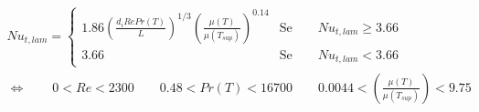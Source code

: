 \documentclass[a4paper,10pt]{article}                                                                                       %
\begin{document}
\begin{equation}                                                                                                            %
  \begin{aligned}                                                                                                           %
  Nu_{t,lam} = \begin{cases}1.86\left(\frac{d_iRePr(T)}{L}\right)^{1/3}                                                     %
  \left(\frac{\mu(T)}{\mu(T_{sup})}\right)^{0.14}&\text{Se}\qquad Nu_{t,lam}\ge3.66\qquad\qquad\\                           %
  3.66&\text{Se}\qquad Nu_{t,lam}<3.66\end{cases}                                                                           %
  \\\Leftrightarrow\qquad                                                                                                   %
  0<Re<2300\qquad0.48<Pr(T)<16700\qquad0.0044<\left(\frac{\mu(T)}{\mu(T_{sup})}\right)<9.75                                 %
  \label{eqn:nu_pipe_l}                                                                                                     %
  \end{aligned}                                                                                                             %
\end{equation}                                                                                                              %
\vspace{3mm}                                                                                                                %
\end{document}
